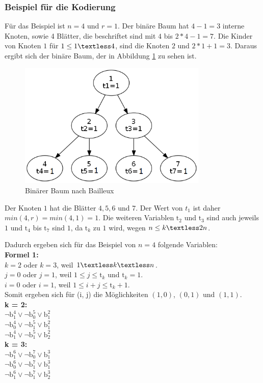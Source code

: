 \documentclass[a4,abstract=on]{scrartcl}
\begin{document}
\subsubsection{Beispiel für die Kodierung}
Für das Beispiel ist $n=4$ und $r =1$. Der binäre Baum hat $4-1 = 3$ interne Knoten, sowie 4 Blätter, die beschriftet sind mit $4$ bis $2*4-1=7$. Die Kinder von Knoten $1$  für $1 \leq 1 \textless 4$, sind die Knoten $2$ und $2*1 +1=3$. Daraus ergibt sich der binäre Baum, der in Abbildung \ref{fig:baum} zu sehen ist.

\begin{figure}[H]
\centering
\includegraphics[width=9cm]{bailleux.png}
\caption{Binärer Baum nach Bailleux}
\label{fig:baum}
\end{figure}

Der Knoten $1$ hat die Blätter $4,5,6$ und $7$. Der Wert von $t_1$ ist daher $min(4,r) = min(4,1) = 1$. Die weiteren Variablen $\text{t}_2$ und $\text{t}_3$ sind auch jeweils $1$ und $\text{t}_4$ bis $\text{t}_7$ sind $1$, da $\text{t}_k$ zu $1$ wird, wegen $n \leq k \textless 2n$.

Dadurch ergeben sich für das Beispiel von $n=4$ folgende Variablen:\\
\textbf{Formel 1:}\\
$k=2$ oder $k=3$, weil $1 \textless k \textless n$.\\
$j=0$ oder $j=1$, weil $1 \leq j \leq \text{t}_k$ und $\text{t}_k = 1$.\\
$i=0$ oder $i=1$, weil $1\leq i+j \leq \text{t}_{k}+1$.\\
Somit ergeben sich für (i, j) die Möglichkeiten $(1,0)$, $(0,1)$ und $(1,1)$.\\
\textbf{k = 2:}\\
$\neg \text{b}_1^4 \vee \neg \text{b}_0^5 \vee \text{b}_1^2$\\
$\neg \text{b}_0^4 \vee \neg \text{b}_1^5 \vee \text{b}_1^2$\\
$\neg \text{b}_1^4 \vee \neg \text{b}_1^5 \vee \text{b}_2^2$\\
\textbf{k = 3:}\\
$\neg \text{b}_1^6 \vee \neg \text{b}_0^7 \vee \text{b}_1^3$\\
$\neg \text{b}_0^6 \vee \neg \text{b}_1^7 \vee \text{b}_1^3$\\
$\neg \text{b}_1^6 \vee \neg \text{b}_1^7 \vee \text{b}_2^3$\\
\end{document}

